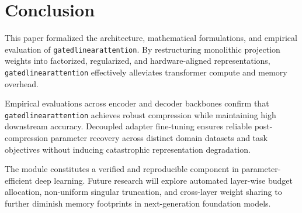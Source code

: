 \section{Conclusion}
This paper formalized the architecture, mathematical formulations, and empirical evaluation of \texttt{gatedlinearattention}. By restructuring monolithic projection weights into factorized, regularized, and hardware-aligned representations, \texttt{gatedlinearattention} effectively alleviates transformer compute and memory overhead.

Empirical evaluations across encoder and decoder backbones confirm that \texttt{gatedlinearattention} achieves robust compression while maintaining high downstream accuracy. Decoupled adapter fine-tuning ensures reliable post-compression parameter recovery across distinct domain datasets and task objectives without inducing catastrophic representation degradation.

The module constitutes a verified and reproducible component in parameter-efficient deep learning. Future research will explore automated layer-wise budget allocation, non-uniform singular truncation, and cross-layer weight sharing to further diminish memory footprints in next-generation foundation models.
